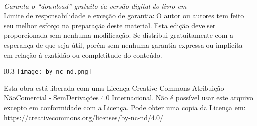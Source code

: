 ~\\

\noindent \textit{Garanta o ``download'' gratuito da versão digital do livro em \ImprimirLinkHomePageLivro}\\


\noindent Limite de responsabilidade e exceção de garantia: O autor ou autores tem feito
seu melhor esforço na preparação deste material.
Esta edição deve ser proporcionada sem nenhuma modificação. 
Se distribui gratuitamente com a esperança de que seja útil, 
porém sem nenhuma garantia expressa ou implícita em relação à exatidão ou completitude do conteúdo.


\vfill
\begin{wrapfigure}{l}{0.3\textwidth}
\texttt{[image: by-nc-nd.png]}
\end{wrapfigure}
\noindent Esta obra está liberada com uma Licença 
Creative Commons Atribuição - NãoComercial - SemDerivações 4.0 Internacional.
Não é possível usar este arquivo excepto em conformidade com a Licença. 
Pode obter uma copia da Licença em:
\url{https://creativecommons.org/licenses/by-nc-nd/4.0/}\\ %
